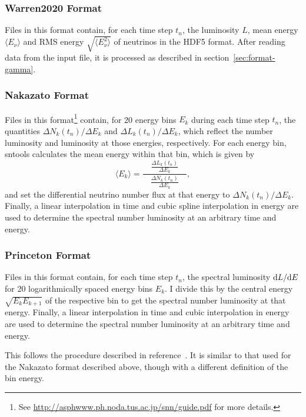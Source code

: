 \documentclass[11pt, oneside]{article}
\renewcommand{\d}{\mathrm{d}}
\newcommand{\tdiffx}[3][\empty]{\ifx\empty#1
		\d #2 / \d #3
	\else
		\d^{#1} #2 / \d #3^{#1}
	\fi} %
\newcommand{\mean}[1]{\ensuremath{\langle #1 \rangle}}
\begin{document}
\subsubsection{Warren2020 Format}
Files in this format contain, for each time step $t_n$, the luminosity $L$, mean energy $\mean{E_\nu}$ and RMS energy $\sqrt{\mean{E_\nu^2}}$ of neutrinos in the HDF5 format.
After reading data from the input file, it is processed as described in section~\ref{sec:format-gamma}.

\subsubsection{Nakazato Format}
Files in this format\footnote{See \url{http://asphwww.ph.noda.tus.ac.jp/snn/guide.pdf} for more details.} contain, for 20 energy bins $E_k$ during each time step $t_n$, the quantities $\Delta N_k (t_n) / \Delta E_k$ and $\Delta L_k (t_n) / \Delta E_k$, which reflect the number luminosity and luminosity at those energies, respectively.
For each energy bin, sntools calculates the mean energy within that bin, which is given by
\begin{equation}
\mean{E_k} = \frac{\quad  \frac{\Delta L_k (t_n)}{\Delta E_k}  \quad}{  \frac{\Delta N_k (t_n)}{\Delta E_k}  },
\end{equation}
and set the differential neutrino number flux at that energy to $\Delta N_k (t_n) / \Delta E_k$.
Finally, a linear interpolation in time and cubic spline interpolation in energy are used to determine the spectral number luminosity at an arbitrary time and energy. %

\subsubsection{Princeton Format}
Files in this format contain, for each time step $t_n$, the spectral luminosity $\tdiffx{L}{E}$ for 20 logarithmically spaced energy bins $E_k$.
I divide this by the central energy $\sqrt{E_k E_{k+1}}$ of the respective bin to get the spectral number luminosity at that energy.
Finally, a linear interpolation in time and cubic interpolation in energy are used to determine the spectral number luminosity at an arbitrary time and energy.

This follows the procedure described in reference~\cite{Seadrow2018}.
It is similar to that used for the Nakazato format described above, though with a different definition of the bin energy.
\end{document}
